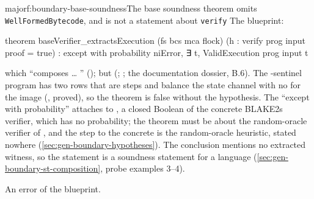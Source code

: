 \begin{finding}{major}{f:boundary-base-soundness}{The base soundness theorem omits \texttt{WellFormedBytecode}, and is not a statement about \texttt{verify}}
 The blueprint:
\begin{leancode}
theorem baseVerifier_extractsExecution (fs bcs mca flock) (h : verify prog input proof = true) :
    except with probability niError, ∃ t, ValidExecution prog input t
\end{leancode}
which \enquote{composes … } (); but
 (;
; the documentation dossier,  B.6). The
-sentinel program has two rows that are steps and balance the state channel with no
 for the image (,
proved), so the theorem is false without the hypothesis. The \enquote{except with probability}
attaches to , a closed Boolean of the concrete BLAKE2s
verifier, which has no probability; the theorem must be about the random-oracle verifier of
, and the step to the concrete  is the random-oracle
heuristic, stated nowhere (\cref{sec:gen-boundary-hypotheses}). The conclusion mentions no
extracted witness, so the statement is a soundness statement for a language
(\cref{sec:gen-boundary-st-composition}, probe  examples 3--4).

 An error of the blueprint.


\end{finding}

